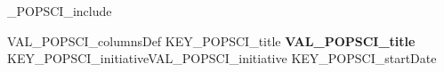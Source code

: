 %
\ifVAL_POPSCI_include %
\begin{myTableEnv}{VAL_POPSCI_columnsDef}
    \myRow
        {KEY_POPSCI_title}
        {\bfseries VAL_POPSCI_title}
        {KEY_POPSCI_initiative}{VAL_POPSCI_initiative}%
    \myRow
        {KEY_POPSCI_startDate}{} 
        {}{}%
\end{myTableEnv}
%
\fi%
%
